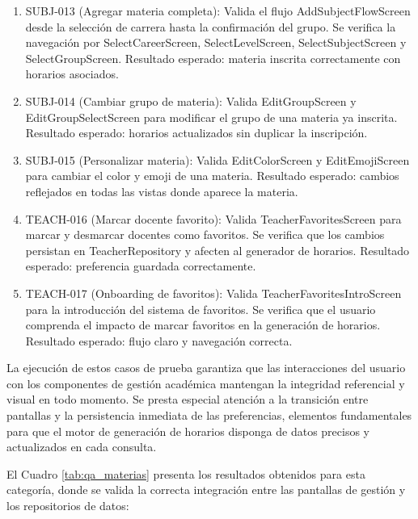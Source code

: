   \begin{enumerate}[label=\alph*)]
    \item SUBJ-013 (Agregar materia completa): Valida el flujo AddSubjectFlowScreen desde la selección de carrera hasta la confirmación del grupo. Se verifica la navegación por SelectCareerScreen, SelectLevelScreen, SelectSubjectScreen y SelectGroupScreen. Resultado esperado: materia inscrita correctamente con horarios asociados.
    
    \item SUBJ-014 (Cambiar grupo de materia): Valida EditGroupScreen y EditGroupSelectScreen para modificar el grupo de una materia ya inscrita. Resultado esperado: horarios actualizados sin duplicar la inscripción.
    
    \item SUBJ-015 (Personalizar materia): Valida EditColorScreen y EditEmojiScreen para cambiar el color y emoji de una materia. Resultado esperado: cambios reflejados en todas las vistas donde aparece la materia.
    
    \item TEACH-016 (Marcar docente favorito): Valida TeacherFavoritesScreen para marcar y desmarcar docentes como favoritos. Se verifica que los cambios persistan en TeacherRepository y afecten al generador de horarios. Resultado esperado: preferencia guardada correctamente.
    
    \item TEACH-017 (Onboarding de favoritos): Valida TeacherFavoritesIntroScreen para la introducción del sistema de favoritos. Se verifica que el usuario comprenda el impacto de marcar favoritos en la generación de horarios. Resultado esperado: flujo claro y navegación correcta.
  \end{enumerate}
  
  La ejecución de estos casos de prueba garantiza que las interacciones del usuario con los componentes de gestión académica mantengan la integridad referencial y visual en todo momento. Se presta especial atención a la transición entre pantallas y la persistencia inmediata de las preferencias, elementos fundamentales para que el motor de generación de horarios disponga de datos precisos y actualizados en cada consulta.
  
  El Cuadro \ref{tab:qa_materias} presenta los resultados obtenidos para esta categoría, donde se valida la correcta integración entre las pantallas de gestión y los repositorios de datos:
  
